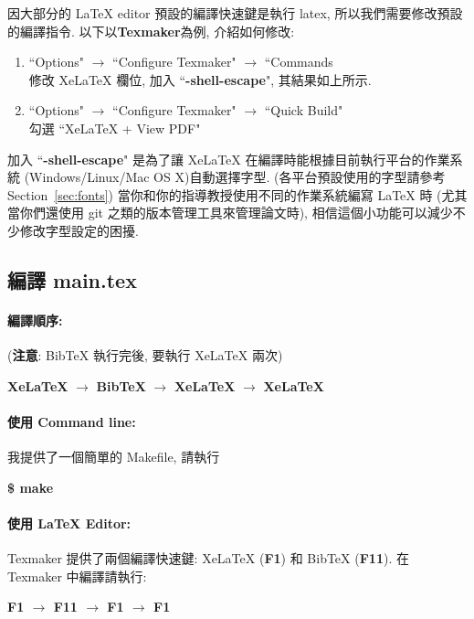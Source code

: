 因大部分的 LaTeX editor 預設的編譯快速鍵是執行 latex, 所以我們需要修改預設的編譯指令.
以下以\textbf{Texmaker}為例, 介紹如何修改:
\begin{enumerate}
\item ``Options" $\rightarrow$ ``Configure Texmaker" $\rightarrow$ ``Commands\\
修改 XeLaTeX 欄位, 加入 ``\textbf{-shell-escape}", 其結果如上所示.
\item ``Options" $\rightarrow$ ``Configure Texmaker" $\rightarrow$ ``Quick Build"\\
勾選 ``XeLaTeX + View PDF"

\end{enumerate}

加入 ``\textbf{-shell-escape}" 是為了讓 XeLaTeX 在編譯時能根據目前執行平台的作業系統 (Windows/Linux/Mac OS X)自動選擇字型.
(各平台預設使用的字型請參考 Section~\ref{sec:fonts})
當你和你的指導教授使用不同的作業系統編寫 LaTeX 時 (尤其當你們還使用 git 之類的版本管理工具來管理論文時), 相信這個小功能可以減少不少修改字型設定的困擾.

\subsection{編譯 main.tex}

\paragraph{編譯順序:} (\textbf{注意}: BibTeX 執行完後, 要執行 XeLaTeX 兩次)

\hspace{2em} \textbf{XeLaTeX} $\rightarrow$ \textbf{BibTeX} $\rightarrow$ \textbf{XeLaTeX} $\rightarrow$ \textbf{XeLaTeX}

\paragraph{使用 Command line:} 我提供了一個簡單的 Makefile, 請執行

\hspace{2em} \textbf{\$ make}

\paragraph{使用 LaTeX Editor:}
Texmaker 提供了兩個編譯快速鍵: XeLaTeX (\textbf{F1}) 和 BibTeX (\textbf{F11}).
在 Texmaker 中編譯請執行:

\hspace{2em} \textbf{F1 $\rightarrow$ F11 $\rightarrow$ F1 $\rightarrow$ F1}

